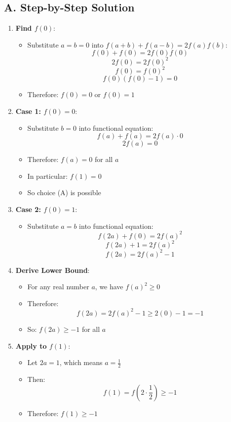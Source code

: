 \documentclass[12pt]{article}
\begin{document}
\begin{solutionbox}
\subsection*{A. Step-by-Step Solution}
\begin{enumerate}[leftmargin=*]
    \item \textbf{Find $f(0)$}: 
    \begin{itemize}
        \item Substitute $a = b = 0$ into $f(a+b) + f(a-b) = 2f(a)f(b)$:
        \[f(0) + f(0) = 2f(0)f(0)\]
        \[2f(0) = 2f(0)^2\]
        \[f(0) = f(0)^2\]
        \[f(0)(f(0) - 1) = 0\]
        \item Therefore: $f(0) = 0$ or $f(0) = 1$
    \end{itemize}
    
    \item \textbf{Case 1: $f(0) = 0$}: 
    \begin{itemize}
        \item Substitute $b = 0$ into functional equation:
        \[f(a) + f(a) = 2f(a) \cdot 0\]
        \[2f(a) = 0\]
        \item Therefore: $f(a) = 0$ for all $a$
        \item In particular: $f(1) = 0$
        \item So choice (A) is possible
    \end{itemize}
    
    \item \textbf{Case 2: $f(0) = 1$}: 
    \begin{itemize}
        \item Substitute $a = b$ into functional equation:
        \[f(2a) + f(0) = 2f(a)^2\]
        \[f(2a) + 1 = 2f(a)^2\]
        \[f(2a) = 2f(a)^2 - 1\]
    \end{itemize}
    
    \item \textbf{Derive Lower Bound}: 
    \begin{itemize}
        \item For any real number $a$, we have $f(a)^2 \geq 0$
        \item Therefore:
        \[f(2a) = 2f(a)^2 - 1 \geq 2(0) - 1 = -1\]
        \item So: $f(2a) \geq -1$ for all $a$
    \end{itemize}
    
    \item \textbf{Apply to $f(1)$}: 
    \begin{itemize}
        \item Let $2a = 1$, which means $a = \frac{1}{2}$
        \item Then:
        \[f(1) = f\left(2 \cdot \frac{1}{2}\right) \geq -1\]
        \item Therefore: $f(1) \geq -1$
    \end{itemize}
    

\end{enumerate}
\end{solutionbox}
\end{document}
